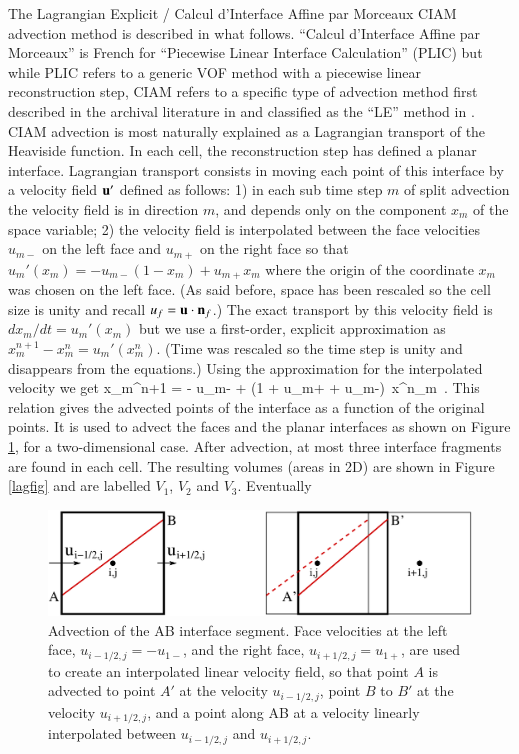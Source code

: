  The Lagrangian Explicit / Calcul d'Interface Affine par Morceaux
CIAM advection method is described in what follows. ``Calcul d'Interface Affine
par Morceaux'' is French for ``Piecewise Linear Interface
Calculation'' (PLIC) but while PLIC refers to a generic VOF method with
a piecewise linear reconstruction step, CIAM refers to a specific type
of advection method first described in the archival literature in
\cite{li95} and classified as the ``LE'' method in
\cite{Scardovelli02}.  CIAM advection is most naturally explained
as a Lagrangian transport of the Heaviside function. In each cell, the
reconstruction step has defined a planar interface. Lagrangian
transport consists in moving each point of this interface by
a velocity field ${\bf u}'$ defined as follows: 1) in each sub time step
$m$ of split advection the velocity field is in direction $m$, and
depends only on the component $x_m$ of the space variable; 2) the
velocity field is interpolated between the face velocities $u_{m-}$ on
the left face and $u_{m+}$ on the right face so that 
$u_m' ( x_m) = - u_{m-}( 1 - x_m) + u_{m+} x_m$ where the origin of the coordinate
$x_m$ was chosen on the left face. (As said before, space has been
rescaled so the cell size is unity and recall $u_f = {\bf u}\cdot {\bf n}_f$.) 
The exact transport by this velocity field is $d x_m / dt = u_m'(x_m)$ but we use 
a first-order, explicit approximation as $x_m^{n+1} - x_m^n = u_m'(x_m^n)$. 
(Time was rescaled so the time step is unity and disappears from the equations.) 
Using the approximation for the interpolated velocity we get 
\be
x_m^{n+1} =  - u_{m-} +  (1 +  u_{m+} + u_{m-}) \,x^n_m \,.
\label{map}
\nd
This relation gives the
advected points of the interface as a function of the original
points. It is used to advect the faces and the planar interfaces as
shown on Figure \ref{macfig}, for a two-dimensional case. After advection, at most 
three interface fragments are found in each cell. The resulting volumes 
(areas in 2D) are shown in Figure \ref{lagfig} and are labelled $V_1$, $V_2$ and $V_3$. 
Eventually 
\begin{figure}
\begin{center}
    \includegraphics[width=0.75 \textwidth]{Figures/band1bis}
\end{center}
\caption{Advection of the AB interface segment. Face velocities at the left face, 
$u_{i-1/2,j} = -u_{1-}$, and the right face, $u_{i+1/2,j} = u_{1+}$,
are used to create an interpolated linear velocity field, so that point $A$ is advected 
to point $A'$ at the velocity $u_{i-1/2,j}$, point $B$ to $B'$ at  the velocity $u_{i+1/2,j}$, 
and a point along AB at a velocity linearly interpolated between $u_{i-1/2,j}$ and  $u_{i+1/2,j}$.}
\label{macfig}
\end{figure}
